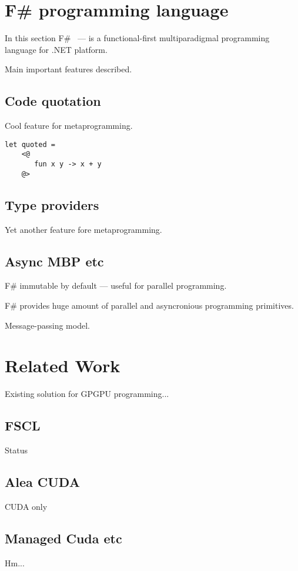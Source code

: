 \section{F\# programming language}

In this section F\#~\cite{fsharp} --- is a functional-first multiparadigmal programming language for .NET platform.

Main important features described.

\subsection{Code quotation}

Cool feature for metaprogramming.

\begin{lstlisting}[label=code_quotation_example,caption=Example of F\# code quotation]
let quoted = 
    <@
       fun x y -> x + y
    @>
\end{lstlisting}


\subsection{Type providers}

Yet another feature fore metaprogramming.

\subsection{Async MBP etc}

F\# immutable by default --- useful for parallel programming.

F\# provides huge amount of parallel and asyncronious programming primitives.

Message-passing model.

\section{Related Work}

Existing solution for GPGPU programming...

\subsection{FSCL}

Status~\cite{FSCLPhD}

\subsection{Alea CUDA}

CUDA only

\subsection{Managed Cuda etc}

Hm...